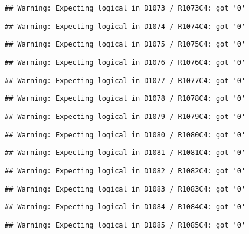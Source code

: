 \documentclass[
]{article}
\begin{document}
\begin{verbatim}
## Warning: Expecting logical in D1073 / R1073C4: got '0'
\end{verbatim}

\begin{verbatim}
## Warning: Expecting logical in D1074 / R1074C4: got '0'
\end{verbatim}

\begin{verbatim}
## Warning: Expecting logical in D1075 / R1075C4: got '0'
\end{verbatim}

\begin{verbatim}
## Warning: Expecting logical in D1076 / R1076C4: got '0'
\end{verbatim}

\begin{verbatim}
## Warning: Expecting logical in D1077 / R1077C4: got '0'
\end{verbatim}

\begin{verbatim}
## Warning: Expecting logical in D1078 / R1078C4: got '0'
\end{verbatim}

\begin{verbatim}
## Warning: Expecting logical in D1079 / R1079C4: got '0'
\end{verbatim}

\begin{verbatim}
## Warning: Expecting logical in D1080 / R1080C4: got '0'
\end{verbatim}

\begin{verbatim}
## Warning: Expecting logical in D1081 / R1081C4: got '0'
\end{verbatim}

\begin{verbatim}
## Warning: Expecting logical in D1082 / R1082C4: got '0'
\end{verbatim}

\begin{verbatim}
## Warning: Expecting logical in D1083 / R1083C4: got '0'
\end{verbatim}

\begin{verbatim}
## Warning: Expecting logical in D1084 / R1084C4: got '0'
\end{verbatim}

\begin{verbatim}
## Warning: Expecting logical in D1085 / R1085C4: got '0'
\end{verbatim}
\end{document}
